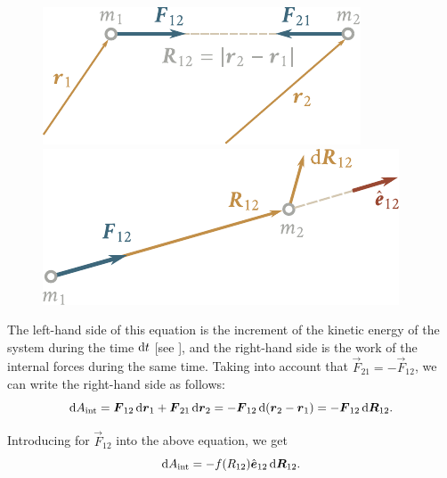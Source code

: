 \begin{figure}[t]
	\begin{minipage}[t]{0.5\linewidth}
		\begin{center}
			\includegraphics[scale=0.89]{figures/ch_03/fig_3_11.pdf}
			\caption[]{}
			\label{fig:3_11}
		\end{center}
	\end{minipage}
	\hspace{-0.05cm}
	\begin{minipage}[t]{0.5\linewidth}
		\begin{center}
			\includegraphics[scale=0.89]{figures/ch_03/fig_3_12.pdf}
			\caption[]{}
			\label{fig:3_12}
		\end{center}
	\end{minipage}
\end{figure}

\noindent
The left-hand side of this equation is the increment of the kinetic energy of the system during the time $\mathrm{d} t$ [see ], and the right-hand side is the work of the internal forces during the same time. Taking into account that $\vec{F}_{21}=-\vec{F}_{12}$, we can write the right-hand side as follows:
\begin{equation}\label{eq:3_43}
\mathrm{d} A_{\text{int}} = \boldsymbol{F}_{12}\,\mathrm{d}\boldsymbol{r}_1 + \boldsymbol{F}_{21}\,\mathrm{d}\boldsymbol{r}_2 = -\boldsymbol{F}_{12}\,\mathrm{d}(\boldsymbol{r}_2-\boldsymbol{r}_1) = -\boldsymbol{F}_{12}\,\mathrm{d}\boldsymbol{R}_{12}.
\end{equation}

\noindent
Introducing  for $\vec{F}_{12}$ into the above equation, we get
\begin{equation*}
\mathrm{d} A_{\text{int}} = - f(R_{12}) \hat{\boldsymbol{e}}_{12} \, \mathrm{d}\boldsymbol{R}_{12}.
\end{equation*}

